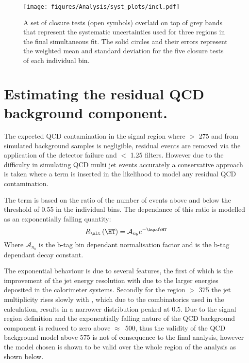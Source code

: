 \begin{figure}[!h]
  \begin{center}
    \texttt{[image: figures/Analysis/syst\_plots/incl.pdf]}
    \caption{A set of closure tests (open symbols) overlaid on top of
      grey bands that represent the systematic uncertainties used for
      three \HT regions in the final simultaneous fit. The solid
      circles and their errors represent the weighted mean and
      standard deviation for the five closure tests of each individual
      \HT bin.}
    \label{fig:closure-summary}
  \end{center}
\end{figure}




\section{Estimating the residual QCD background 
component.} %
\label{sec:estimating_the_residual_qcd_background_component_}
The expected QCD contamination in the signal region where \HT $>$
\unit{275}{\GeV} and \altg from simulated background samples is 
negligible\cite{CMS-AN-11-517}, residual events are removed via the application 
of the detector failure and \Rmiss $<$ 1.25 filters. However due to the 
difficulty in simulating QCD multi jet events accurately a conservative 
approach is taken where a term is inserted in the likelihood to model any 
residual QCD contamination.

The term is based on the ratio of the number of events above and below the \alt 
threshold of 0.55 in the individual \HT bins. The dependance of this ratio is 
modelled as an exponentially falling quantity:
\begin{equation}
  R_{\alt}\left(\HT\right)=\mathcal{A}_{n_{b}}e^{-\kqcd\HT}
\end{equation}
Where $\mathcal{A}_{n_{b}}$ is the b-tag bin dependant normalisation factor and 
\kqcd is the b-tag dependant decay constant.

The exponential behaviour is due to several features, the first of which is the 
improvement of the jet energy resolution with \HT due to the larger energies 
deposited in the calorimeter systems. Secondly for the region \HT $>$ 
\unit{375}{\GeV} the jet multiplicity rises slowly with \HT, which due to the 
combinatorics  used in the \alt calculation, results in a narrower \alt 
distribution peaked at 0.5. Due to the signal region definition and the 
exponentially falling nature of the QCD background component is reduced to zero 
above $\approx$~\unit{500}{\GeV}, thus the validity of the QCD background model 
above \unit{575}{\GeV} is not of consequence to the final analysis, however the 
model chosen is shown to be valid over the whole \HT region of the analysis as 
shown below.


